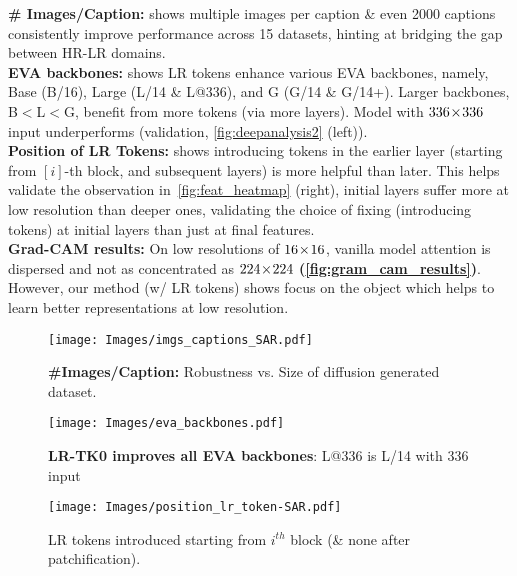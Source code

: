 \noindent \textbf{\# Images/Caption:}
\textbf{} shows 
multiple images per caption \& even 2000 captions consistently improve performance across 15 datasets, hinting at bridging the gap between HR-LR  domains. \vspace{4pt} \\
\noindent \textbf{EVA backbones:} 
\textbf{}  shows 
LR tokens enhance various EVA backbones, namely, Base (B/16), Large (L/14 \& L@336), and G (G/14 \& G/14+).
Larger backbones, B$<$L$<$G, benefit from 
more tokens (via more layers).
Model with 
$336\!\times\!336$ input underperforms (validation, \cref{fig:deepanalysis2} (left)). \vspace{4pt} \\
\noindent \textbf{Position of LR Tokens:}
 \textbf{} shows introducing tokens in the earlier layer (starting from $[i]$-th block, and subsequent layers) is more helpful than later. This helps validate the observation in~\cref{fig:feat_heatmap} (right), \ie 
 initial layers suffer more at low resolution than deeper ones, validating the choice of fixing (introducing tokens) at initial layers than just at final features. \vspace{4pt} \\
\noindent \textbf{Grad-CAM results:} 
On low resolutions of $16\!\times\!16$, vanilla model attention is dispersed and not as concentrated as $224\!\times\!224$ \textbf{(\cref{fig:gram_cam_results})}. However, our method (w/ LR tokens) shows focus on the object which helps to learn better representations at low resolution.
\vspace{-4pt}

\begin{figure*}[!tb]
\centering
\begin{minipage}{0.3\textwidth}
\centering
\texttt{[image: Images/imgs\_captions\_SAR.pdf]}
\vspace{-2pt}
\caption{\textbf{\#Images/Caption:} Robustness vs. Size of diffusion generated dataset.
}
\label{fig:img_per_caption}
\end{minipage}
\hfill
\begin{minipage}{0.31\textwidth}
\centering
\texttt{[image: Images/eva\_backbones.pdf]}
\vspace{-2pt}
\caption{\textbf{LR-TK0 improves all EVA backbones}: L@336 is L/14 with 336 input}
\label{fig:eva_backbones}
\end{minipage}
\hfill
\begin{minipage}{0.31\textwidth}
\centering
\texttt{[image: Images/position\_lr\_token-SAR.pdf]}
\vspace{-2pt}
\caption{ 
\boldsymbol{$[i]$} LR tokens introduced starting from $i^{th}$ block (\& none after patchification). 
}
\label{fig:pos_lr_tokens}  
\end{minipage}
 \vspace{-6pt}
\end{figure*}



